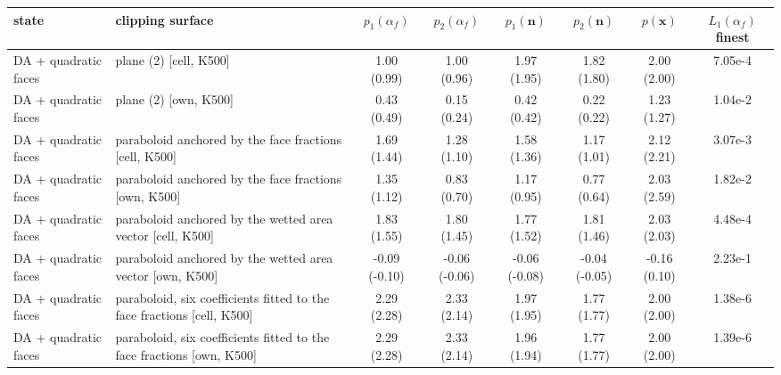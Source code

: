 \begin{tabular}{llcccccc}
\toprule
state & clipping surface & $p_1(\alpha_f)$ & $p_2(\alpha_f)$ & $p_1(\mathbf{n})$ & $p_2(\mathbf{n})$ & $p(\mathbf{x})$ & $L_1(\alpha_f)$ finest \\
\midrule
DA + quadratic faces & plane (2) [cell, K500] & 1.00 (0.99) & 1.00 (0.96) & 1.97 (1.95) & 1.82 (1.80) & 2.00 (2.00) & 7.05e-4 \\
DA + quadratic faces & plane (2) [own, K500] & 0.43 (0.49) & 0.15 (0.24) & 0.42 (0.42) & 0.22 (0.22) & 1.23 (1.27) & 1.04e-2 \\
DA + quadratic faces & paraboloid anchored by the face fractions [cell, K500] & 1.69 (1.44) & 1.28 (1.10) & 1.58 (1.36) & 1.17 (1.01) & 2.12 (2.21) & 3.07e-3 \\
DA + quadratic faces & paraboloid anchored by the face fractions [own, K500] & 1.35 (1.12) & 0.83 (0.70) & 1.17 (0.95) & 0.77 (0.64) & 2.03 (2.59) & 1.82e-2 \\
DA + quadratic faces & paraboloid anchored by the wetted area vector [cell, K500] & 1.83 (1.55) & 1.80 (1.45) & 1.77 (1.52) & 1.81 (1.46) & 2.03 (2.03) & 4.48e-4 \\
DA + quadratic faces & paraboloid anchored by the wetted area vector [own, K500] & -0.09 (-0.10) & -0.06 (-0.06) & -0.06 (-0.08) & -0.04 (-0.05) & -0.16 (0.10) & 2.23e-1 \\
DA + quadratic faces & paraboloid, six coefficients fitted to the face fractions [cell, K500] & 2.29 (2.28) & 2.33 (2.14) & 1.97 (1.95) & 1.77 (1.77) & 2.00 (2.00) & 1.38e-6 \\
DA + quadratic faces & paraboloid, six coefficients fitted to the face fractions [own, K500] & 2.29 (2.28) & 2.33 (2.14) & 1.96 (1.94) & 1.77 (1.77) & 2.00 (2.00) & 1.39e-6 \\
\bottomrule
\end{tabular}
